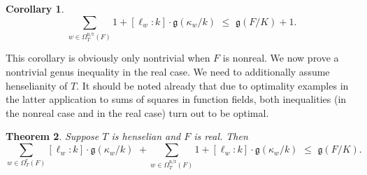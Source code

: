 \documentclass[a4paper,12pt,reqno]{amsart}
\newtheorem{thm}{Theorem}[section]
\newtheorem{cor}[thm]{Corollary}
\theoremstyle{definition}
\numberwithin{equation}{thm}
\renewcommand{\leq}{\leqslant}
\begin{document}
\begin{cor}\label{nonreal-genus-inequality} 
 $$\sum_{w \in \Omega^{\text{n/r}}_T(F)} \!\!\!\! 1+ [\ell_w:k]\cdot \mathfrak{g}(\kappa_w/k) \,\, \leq  \,\,\mathfrak{g}(F/K) + 1.$$   
\end{cor}
This corollary is obviously only nontrivial when $F$ is nonreal.
We now prove a nontrivial genus inequality in the real case. We need to additionally assume henselianity of $T$. It should be noted already that due to optimality examples in the latter application to sums of squares in function fields, both inequalities (in the nonreal case and in the real case) turn out to be optimal.

\begin{thm}\label{real-genus-inequality} Suppose $T$  is henselian and $F$ is real. Then
$$\sum_{w \in \Omega^{\text{r}}_T(F)} \!\! [\ell_w:k] \cdot \mathfrak{g}(\kappa_w/k) \, \, + \sum_{w \in \Omega^{\text{n/r}}_T(F)} \!\!\!\! 1+ [\ell_w:k]\cdot \mathfrak{g}(\kappa_w/k) \,\, \leq  \,\,\mathfrak{g}(F/K).$$
\end{thm}
\end{document}

